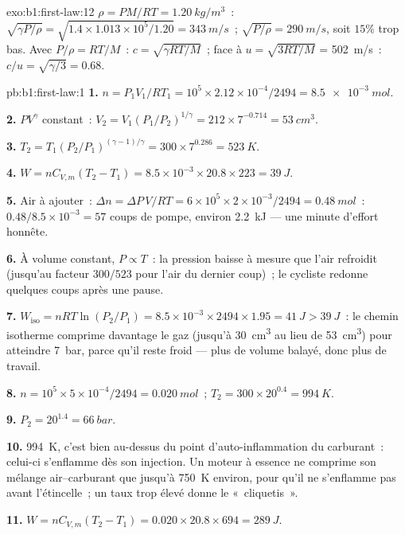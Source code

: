 \begin{solution}{exo:b1:first-law:12}
$\rho = PM/RT = \qty{1.20}{kg/m^3}$~: $\sqrt{\gamma P/\rho} = \sqrt{1.4 \times
1.013\times10^5/1.20} = \qty{343}{m/s}$~; $\sqrt{P/\rho} = \qty{290}{m/s}$, soit $15\%$
trop bas. Avec $P/\rho = RT/M$~: $c = \sqrt{\gamma RT/M}$~; face à $u = \sqrt{3RT/M}$
= \qty{502}{m/s}~: $c/u = \sqrt{\gamma/3} = 0.68$.
\end{solution}

\begin{solution}{pb:b1:first-law:1}
\textbf{1.} $n = P_1V_1/RT_1 = 10^5 \times 2.12\times10^{-4}/2494 = \qty{8.5e-3}{mol}$.

\textbf{2.} $PV^\gamma$ constant~: $V_2 = V_1(P_1/P_2)^{1/\gamma} = 212 \times
7^{-0.714} = \qty{53}{cm^3}$.

\textbf{3.} $T_2 = T_1(P_2/P_1)^{(\gamma - 1)/\gamma} = 300 \times 7^{0.286} =
\qty{523}{K}$.

\textbf{4.} $W = nC_{V,m}(T_2 - T_1) = 8.5\times10^{-3} \times 20.8 \times 223 =
\qty{39}{J}$.

\textbf{5.} Air à ajouter~: $\Delta n = \Delta P\,V/RT = 6\times10^5 \times 2\times10^{-3}/
2494 = \qty{0.48}{mol}$~: $0.48/8.5\times10^{-3} = 57$ coups de pompe, environ
\qty{2.2}{kJ} --- une minute d'effort honnête.

\textbf{6.} À volume constant, $P \propto T$~: la pression baisse à mesure que
l'air refroidit (jusqu'au facteur $300/523$ pour l'air du dernier coup)~; le
cycliste redonne quelques coups après une pause.

\textbf{7.} $W_{\text{iso}} = nRT\ln(P_2/P_1) = 8.5\times10^{-3} \times 2494 \times
1.95 = \qty{41}{J} > \qty{39}{J}$~: le chemin isotherme comprime davantage le
gaz (jusqu'à \qty{30}{cm^3} au lieu de \qty{53}{cm^3}) pour atteindre \qty{7}{bar},
parce qu'il reste froid --- plus de volume balayé, donc plus de travail.

\textbf{8.} $n = 10^5 \times 5\times10^{-4}/2494 = \qty{0.020}{mol}$~; $T_2 =
300 \times 20^{0.4} = \qty{994}{K}$.

\textbf{9.} $P_2 = 20^{1.4} = \qty{66}{bar}$.

\textbf{10.} \qty{994}{K}, c'est bien au-dessus du point d'auto-inflammation
du carburant~: celui-ci s'enflamme dès son injection. Un moteur à essence ne
comprime son mélange air--carburant que jusqu'à \qty{750}{K} environ, pour
qu'il ne s'enflamme pas avant l'étincelle~; un taux trop élevé donne le «~cliquetis~».

\textbf{11.} $W = nC_{V,m}(T_2 - T_1) = 0.020 \times 20.8 \times 694 = \qty{289}{J}$.


\end{solution}
